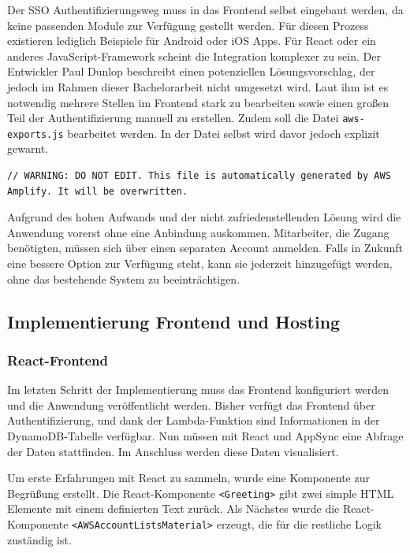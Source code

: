 Der SSO Authentifizierungsweg muss in das Frontend selbst eingebaut werden, da keine passenden Module zur Verfügung gestellt werden.
Für diesen Prozess existieren lediglich Beispiele für Android oder iOS Apps.
Für React oder ein anderes JavaScript-Framework scheint die Integration komplexer zu sein.
Der Entwickler Paul Dunlop beschreibt einen potenziellen Lösungsvorschlag, der jedoch im Rahmen dieser Bachelorarbeit nicht umgesetzt wird.
Laut ihm ist es notwendig mehrere Stellen im Frontend stark zu bearbeiten sowie einen großen Teil der Authentifizierung manuell zu erstellen.
Zudem soll die Datei \verb+aws-exports.js+ bearbeitet werden.
In der Datei selbst wird davor jedoch explizit gewarnt.\cite{AzureADProbleme}

\begin{lstlisting}[basicstyle=\ttfamily\small, breaklines=true , frame = single, backgroundcolor=\color{flashwhite}, caption={Auszug aws-exports.js} ]
// WARNING: DO NOT EDIT. This file is automatically generated by AWS Amplify. It will be overwritten.
\end{lstlisting}

Aufgrund des hohen Aufwands und der nicht zufriedenstellenden Lösung wird die Anwendung vorerst ohne eine Anbindung auskommen.
Mitarbeiter, die Zugang benötigten, müssen sich über einen separaten Account anmelden.
Falls in Zukunft eine bessere Option zur Verfügung steht, kann sie jederzeit hinzugefügt werden, ohne das bestehende System zu beeinträchtigen.


\subsection{Implementierung Frontend und Hosting}

\subsubsection{React-Frontend}
\label{ReactFrontend}
Im letzten Schritt der Implementierung muss das Frontend konfiguriert werden und die Anwendung veröffentlicht werden.
Bisher verfügt das Frontend über Authentifizierung, und dank der Lambda-Funktion sind Informationen in der DynamoDB-Tabelle verfügbar.
Nun müssen mit React und AppSync eine Abfrage der Daten stattfinden.
Im Anschluss werden diese Daten visualisiert.

Um erste Erfahrungen mit React zu sammeln, wurde eine Komponente zur Begrüßung erstellt.
Die React-Komponente \verb+<Greeting>+ gibt zwei simple HTML Elemente mit einem definierten Text zurück.
Als Nächstes wurde die React-Komponente \verb+<AWSAccountListsMaterial>+ erzeugt, die für die restliche Logik zuständig ist.

